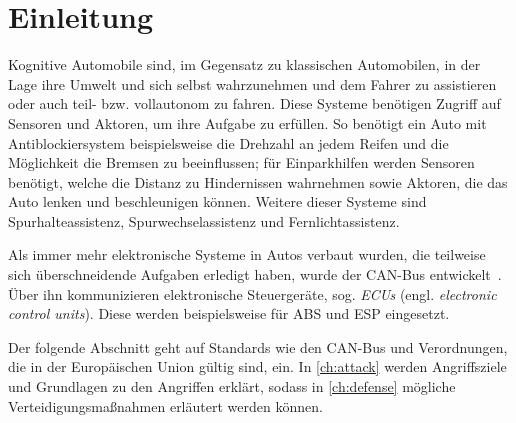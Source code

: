 
\section{Einleitung}
Kognitive Automobile sind, im Gegensatz zu klassischen Automobilen, in der Lage
ihre Umwelt und sich selbst wahrzunehmen und dem Fahrer zu assistieren oder
auch teil- bzw. vollautonom zu fahren. Diese Systeme benötigen Zugriff auf
Sensoren und Aktoren, um ihre Aufgabe zu erfüllen. So benötigt ein Auto mit
Antiblockiersystem beispielsweise die Drehzahl an jedem Reifen und die
Möglichkeit die Bremsen zu beeinflussen; für Einparkhilfen werden Sensoren
benötigt, welche die Distanz zu Hindernissen wahrnehmen sowie Aktoren, die das
Auto lenken und beschleunigen können. Weitere dieser Systeme sind
Spurhalteassistenz, Spurwechselassistenz und Fernlichtassistenz.

Als immer mehr elektronische Systeme in Autos verbaut wurden, die teilweise
sich überschneidende Aufgaben erledigt haben, wurde der CAN-Bus
entwickelt~\cite{Kiencke1986}. Über ihn kommunizieren elektronische
Steuergeräte, sog. \textit{ECUs} (engl. \textit{electronic control units}).
Diese werden beispielsweise für ABS und ESP eingesetzt.

Der folgende Abschnitt geht auf Standards wie den CAN-Bus und Verordnungen, die
in der Europäischen Union gültig sind, ein. In \cref{ch:attack} werden
Angriffsziele und Grundlagen zu den Angriffen erklärt, sodass in
\cref{ch:defense} mögliche Verteidigungsmaßnahmen erläutert werden können.
